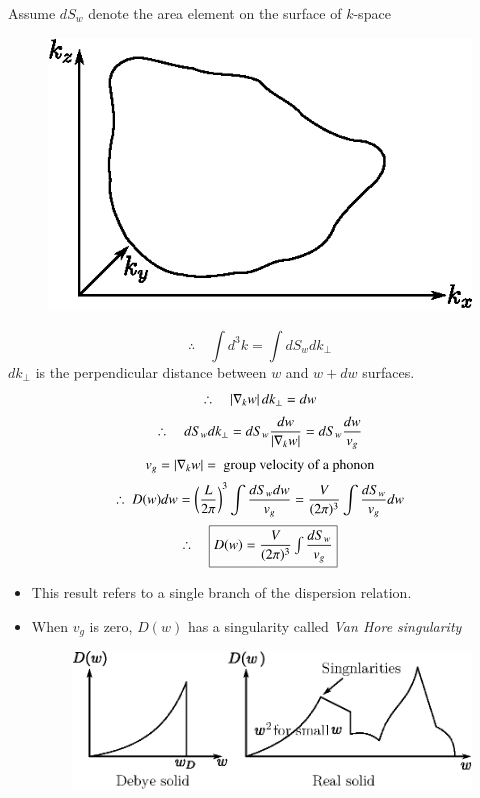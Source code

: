 Assume $dS_{w}$ denote the area element on the surface of $k$-space
\begin{figure}[H]
\centering
\includegraphics[scale=.9]{images/lecture20/fig3.eps}
\end{figure}
$$
\therefore\quad \int d^{3}k=\int dS_{w}dk_{\perp}
$$
$dk_{\perp}$ is the perpendicular distance between $w$ and $w+dw$ surfaces.
\begin{gather*}
\therefore\quad \left|\nabla_{k}w\right| dk_{\perp}=dw\\[2pt]
\therefore\quad dS_{w}dk_{\perp}=dS_{w}\dfrac{dw}{|\nabla_{k}w|}=dS_{w}\dfrac{dw}{v_{g}}\\[2pt]
v_{g}=|\nabla_{k}w|=\text{ group velocity of a phonon}\\[2pt]
\therefore \ D(w)dw=\left(\dfrac{L}{2\pi}\right)^{3}\int \dfrac{dS_{w}dw}{v_{g}}=\dfrac{V}{(2\pi)^{3}}\int \dfrac{dS_{w}}{v_{g}}dw\\[2pt]
\therefore \quad \fbox{$D(w)=\dfrac{V}{(2\pi)^{3}}\int \dfrac{dS_{w}}{v_{g}}$}
\end{gather*}
\begin{itemize}
\item This result refers to a single branch of the dispersion relation.

\item When $v_{g}$ is zero, $D(w)$ has a singularity called {\em Van Hore singularity}
\begin{figure}[H]
\centering
\includegraphics{images/lecture20/fig4.eps}
\end{figure}
\end{itemize}


